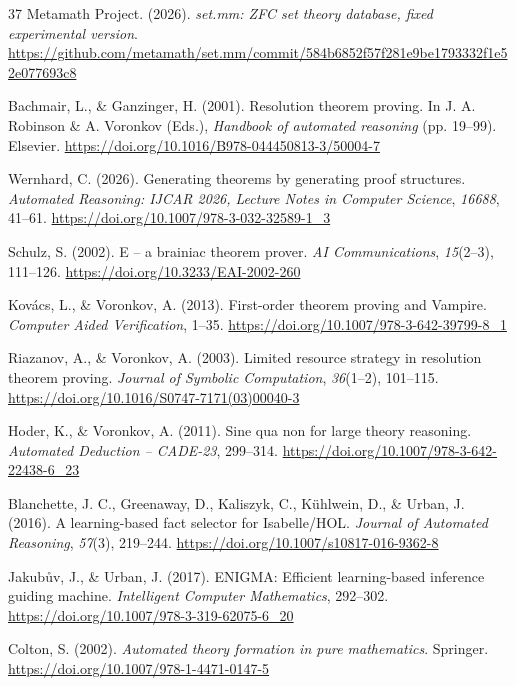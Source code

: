 \documentclass[pdflatex,sn-basic,Numbered]{sn-jnl}
\begin{document}
\begin{thebibliography}{37}
 Metamath Project. (2026). \emph{set.mm: ZFC set theory database, fixed experimental version}. \url{https://github.com/metamath/set.mm/commit/584b6852f57f281e9be1793332f1e52e077693c8}

 Bachmair, L., \& Ganzinger, H. (2001). Resolution theorem proving. In J. A. Robinson \& A. Voronkov (Eds.), \emph{Handbook of automated reasoning} (pp. 19--99). Elsevier. \url{https://doi.org/10.1016/B978-044450813-3/50004-7}

 Wernhard, C. (2026). Generating theorems by generating proof structures. \emph{Automated Reasoning: IJCAR 2026, Lecture Notes in Computer Science}, \emph{16688}, 41--61. \url{https://doi.org/10.1007/978-3-032-32589-1_3}

 Schulz, S. (2002). E -- a brainiac theorem prover. \emph{AI Communications}, \emph{15}(2--3), 111--126. \url{https://doi.org/10.3233/EAI-2002-260}

 Kov\'{a}cs, L., \& Voronkov, A. (2013). First-order theorem proving and Vampire. \emph{Computer Aided Verification}, 1--35. \url{https://doi.org/10.1007/978-3-642-39799-8_1}

 Riazanov, A., \& Voronkov, A. (2003). Limited resource strategy in resolution theorem proving. \emph{Journal of Symbolic Computation}, \emph{36}(1--2), 101--115. \url{https://doi.org/10.1016/S0747-7171(03)00040-3}

 Hoder, K., \& Voronkov, A. (2011). Sine qua non for large theory reasoning. \emph{Automated Deduction -- CADE-23}, 299--314. \url{https://doi.org/10.1007/978-3-642-22438-6_23}

 Blanchette, J. C., Greenaway, D., Kaliszyk, C., K\"{u}hlwein, D., \& Urban, J. (2016). A learning-based fact selector for Isabelle/HOL. \emph{Journal of Automated Reasoning}, \emph{57}(3), 219--244. \url{https://doi.org/10.1007/s10817-016-9362-8}

 Jakub\r{u}v, J., \& Urban, J. (2017). ENIGMA: Efficient learning-based inference guiding machine. \emph{Intelligent Computer Mathematics}, 292--302. \url{https://doi.org/10.1007/978-3-319-62075-6_20}

 Colton, S. (2002). \emph{Automated theory formation in pure mathematics}. Springer. \url{https://doi.org/10.1007/978-1-4471-0147-5}


\end{thebibliography}
\end{document}
